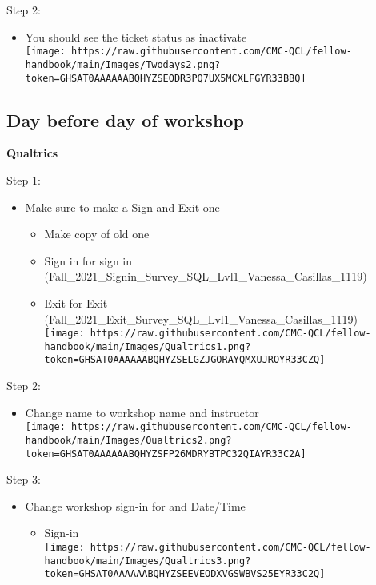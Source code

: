\documentclass[
]{book}
\providecommand{\tightlist}{%
  \setlength{\itemsep}{0pt}\setlength{\parskip}{0pt}}
\begin{document}
Step 2:

\begin{itemize}
\tightlist
\item
  You should see the ticket status as inactivate\\
  \texttt{[image: https://raw.githubusercontent.com/CMC-QCL/fellow-handbook/main/Images/Twodays2.png?token=GHSAT0AAAAAABQHYZSEODR3PQ7UX5MCXLFGYR33BBQ]}
\end{itemize}

\hypertarget{day-before-day-of-workshop}{%
\subsection{Day before day of workshop}\label{day-before-day-of-workshop}}

\textbf{Qualtrics}

Step 1:

\begin{itemize}
\tightlist
\item
  Make sure to make a Sign and Exit one

  \begin{itemize}
  \tightlist
  \item
    Make copy of old one\\
  \item
    Sign in for sign in (Fall\_2021\_Signin\_Survey\_SQL\_Lvl1\_Vanessa\_Casillas\_1119)\\
  \item
    Exit for Exit (Fall\_2021\_Exit\_Survey\_SQL\_Lvl1\_Vanessa\_Casillas\_1119)\\
    \texttt{[image: https://raw.githubusercontent.com/CMC-QCL/fellow-handbook/main/Images/Qualtrics1.png?token=GHSAT0AAAAAABQHYZSELGZJGORAYQMXUJROYR33CZQ]}
  \end{itemize}
\end{itemize}

Step 2:

\begin{itemize}
\tightlist
\item
  Change name to workshop name and instructor\\
  \texttt{[image: https://raw.githubusercontent.com/CMC-QCL/fellow-handbook/main/Images/Qualtrics2.png?token=GHSAT0AAAAAABQHYZSFP26MDRYBTPC32QIAYR33C2A]}
\end{itemize}

Step 3:

\begin{itemize}
\tightlist
\item
  Change workshop sign-in for and Date/Time

  \begin{itemize}
  \tightlist
  \item
    Sign-in\\
    \texttt{[image: https://raw.githubusercontent.com/CMC-QCL/fellow-handbook/main/Images/Qualtrics3.png?token=GHSAT0AAAAAABQHYZSEEVEODXVGSWBVS25EYR33C2Q]}
  \end{itemize}
\end{itemize}
\end{document}
